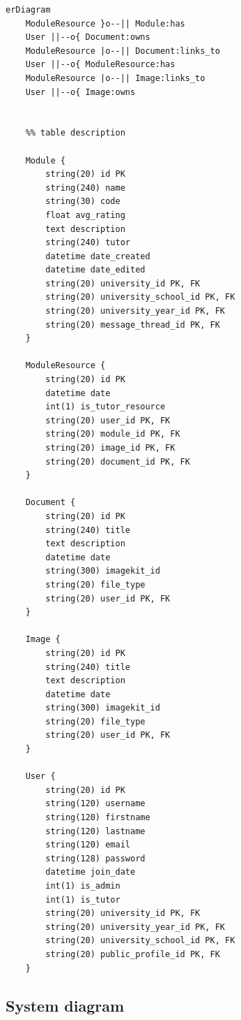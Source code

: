 \begin{lstlisting}
erDiagram
    ModuleResource }o--|| Module:has
    User ||--o{ Document:owns
    ModuleResource |o--|| Document:links_to
    User ||--o{ ModuleResource:has
    ModuleResource |o--|| Image:links_to
    User ||--o{ Image:owns


    %% table description

    Module {
        string(20) id PK
        string(240) name
        string(30) code
        float avg_rating
        text description
        string(240) tutor
        datetime date_created
        datetime date_edited
        string(20) university_id PK, FK
        string(20) university_school_id PK, FK
        string(20) university_year_id PK, FK
        string(20) message_thread_id PK, FK
    }

    ModuleResource {
        string(20) id PK
        datetime date
        int(1) is_tutor_resource
        string(20) user_id PK, FK
        string(20) module_id PK, FK
        string(20) image_id PK, FK
        string(20) document_id PK, FK
    }

    Document {
        string(20) id PK
        string(240) title
        text description
        datetime date
        string(300) imagekit_id
        string(20) file_type
        string(20) user_id PK, FK
    }

    Image {
        string(20) id PK
        string(240) title
        text description
        datetime date
        string(300) imagekit_id
        string(20) file_type
        string(20) user_id PK, FK
    }

    User {
        string(20) id PK
        string(120) username
        string(120) firstname
        string(120) lastname
        string(120) email
        string(128) password
        datetime join_date
        int(1) is_admin
        int(1) is_tutor
        string(20) university_id PK, FK
        string(20) university_year_id PK, FK
        string(20) university_school_id PK, FK
        string(20) public_profile_id PK, FK
    }
\end{lstlisting}

\subsection{System diagram}

